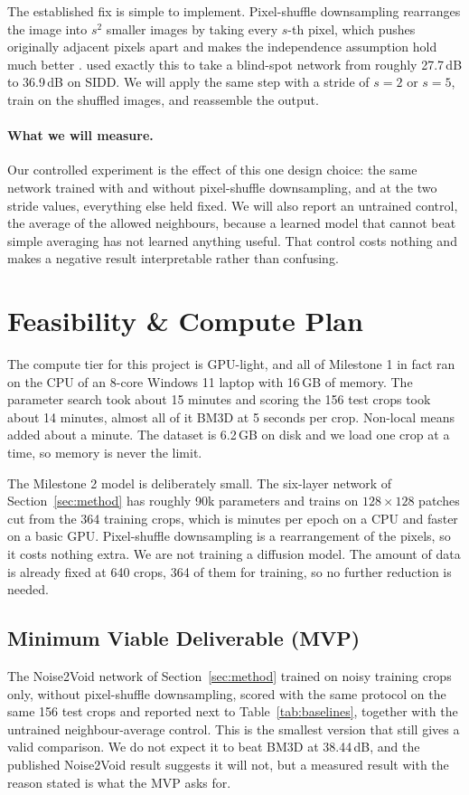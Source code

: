 \documentclass[11pt]{article}
\begin{document}
The established fix is simple to implement. Pixel-shuffle downsampling rearranges the image
into $s^2$ smaller images by taking every $s$-th pixel, which pushes originally adjacent
pixels apart and makes the independence assumption hold much better
\citep{zhou2020awgn}. \citet{lee2022apbsn} used exactly this to take a blind-spot network
from roughly 27.7\,dB to 36.9\,dB on SIDD. We will apply the same step with a stride of
$s = 2$ or $s = 5$, train on the shuffled images, and reassemble the output.

\paragraph{What we will measure.}
Our controlled experiment is the effect of this one design choice: the same network trained
with and without pixel-shuffle downsampling, and at the two stride values, everything else
held fixed. We will also report an untrained control, the average of the allowed
neighbours, because a learned model that cannot beat simple averaging has not learned
anything useful. That control costs nothing and makes a negative result interpretable
rather than confusing.

\section{Feasibility \& Compute Plan}
\label{sec:feasibility}
The compute tier for this project is GPU-light, and all of Milestone 1 in fact ran on the
CPU of an 8-core Windows 11 laptop with 16\,GB of memory. The parameter search took about
15 minutes and scoring the 156 test crops took about 14 minutes, almost all of it BM3D at
5 seconds per crop. Non-local means added about a minute. The dataset is 6.2\,GB on disk
and we load one crop at a time, so memory is never the limit.

The Milestone 2 model is deliberately small. The six-layer network of
Section~\ref{sec:method} has roughly 90k parameters and trains on $128\times128$ patches
cut from the 364 training crops, which is minutes per epoch on a CPU and faster on a basic
GPU. Pixel-shuffle downsampling is a rearrangement of the pixels, so it costs nothing
extra. We are not training a diffusion model. The amount of data is already fixed at 640
crops, 364 of them for training, so no further reduction is needed.

\subsection{Minimum Viable Deliverable (MVP)}
The Noise2Void network of Section~\ref{sec:method} trained on noisy training crops only,
without pixel-shuffle downsampling, scored with the same protocol on the same 156 test
crops and reported next to Table~\ref{tab:baselines}, together with the untrained
neighbour-average control. This is the smallest version that still gives a valid
comparison. We do not expect it to beat BM3D at 38.44\,dB, and the published Noise2Void
result suggests it will not, but a measured result with the reason stated is what the MVP
asks for.
\end{document}
